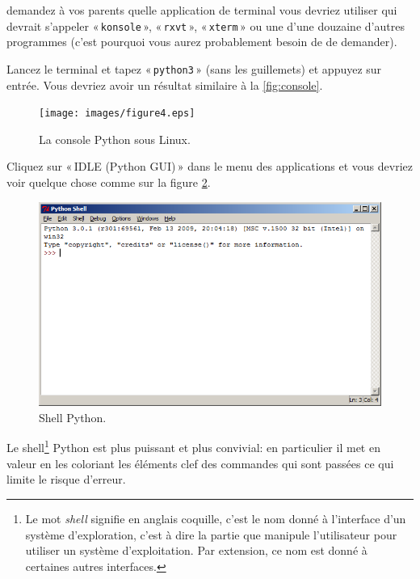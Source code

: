 \begin{LINUX}
demandez à vos parents quelle application de terminal vous devriez utiliser qui devrait s'appeler « \texttt{konsole} », « \texttt{rxvt} », « \texttt{xterm} » ou une d'une douzaine d'autres programmes (c'est pourquoi vous aurez probablement besoin de de demander).

Lancez le terminal et tapez « \texttt{python3} » (sans les guillemets) et appuyez sur entrée. Vous devriez avoir un résultat similaire à la \autoref{fig:console}.
\begin{figure}
\begin{center}
\texttt{[image: images/figure4.eps]}
\end{center}
\caption{La console Python sous Linux.}\label{fig:console}
\end{figure}
\end{LINUX}

Cliquez sur « IDLE (Python GUI) » dans le menu des applications et vous devriez voir quelque chose comme sur la figure \ref{fig:shell}.

\begin{figure}[!ht]
\centering
\includegraphics[scale=0.6]{images/shell}
\caption{Shell Python.}\label{fig:shell}
\end{figure}

Le shell\footnote{Le mot \emph{shell} signifie en anglais coquille, c'est le nom donné à l'interface d'un système d'exploration, c'est à dire la partie que manipule l'utilisateur pour utiliser un système d'exploitation. Par extension, ce nom est donné à certaines autres interfaces.} Python est plus puissant et plus convivial: en particulier il met en valeur en les coloriant les éléments clef des commandes qui sont passées ce qui limite le risque d'erreur.

